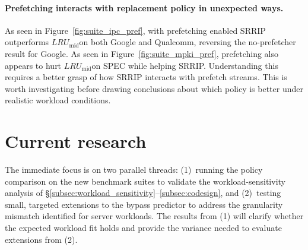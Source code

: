 \documentclass[12pt]{article}
\newcommand{\lrumid}{$LRU_\text{mid}$}
\begin{document}
\paragraph{Prefetching interacts with replacement policy in unexpected ways.}
As seen in Figure~\ref{fig:suite_ipc_pref}, with prefetching enabled SRRIP
outperforms \lrumid on both Google and Qualcomm, reversing the
no-prefetcher result for Google. As seen in Figure~\ref{fig:suite_mpki_pref},
prefetching also appears to hurt \lrumid on SPEC while helping SRRIP.
Understanding this requires a better grasp of how SRRIP interacts with prefetch
streams. This is worth investigating before drawing conclusions about which policy
is better under realistic workload conditions.

\section{Current research}

The immediate focus is on two parallel threads:
(1)~running the policy comparison on the new benchmark suites to validate
the workload-sensitivity analysis of \S\ref{subsec:workload_sensitivity}--\ref{subsec:codesign},
and (2)~testing small, targeted extensions to the bypass predictor to address
the granularity mismatch identified for server workloads.
The results from (1) will clarify whether the expected workload fit holds
and provide the variance needed to evaluate extensions from (2).

\end{document}
